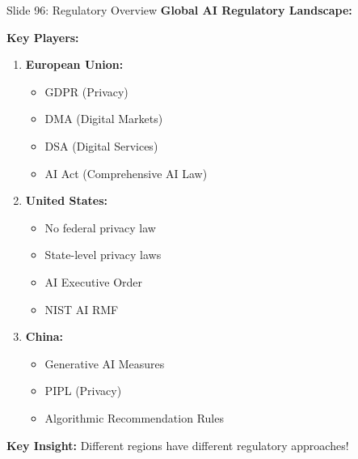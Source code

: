 \documentclass[8pt]{beamer}
\begin{document}
	\begin{frame}{Slide 96: Regulatory Overview}
		\fontsize{6.5}{7.5}\selectfont
		\textbf{Global AI Regulatory Landscape:}
		
		\vspace{0.1cm}
		\textbf{Key Players:}
		\begin{enumerate}
			\item \textbf{European Union:}
			\begin{itemize}
				\item GDPR (Privacy)
				\item DMA (Digital Markets)
				\item DSA (Digital Services)
				\item AI Act (Comprehensive AI Law)
			\end{itemize}
			\item \textbf{United States:}
			\begin{itemize}
				\item No federal privacy law
				\item State-level privacy laws
				\item AI Executive Order
				\item NIST AI RMF
			\end{itemize}
			\item \textbf{China:}
			\begin{itemize}
				\item Generative AI Measures
				\item PIPL (Privacy)
				\item Algorithmic Recommendation Rules
			\end{itemize}
		\end{enumerate}
		
		\textcolor{myblue}{\textbf{Key Insight:}} Different regions have \textcolor{myblue}{different regulatory approaches}!
	\end{frame}
	
\end{document}
